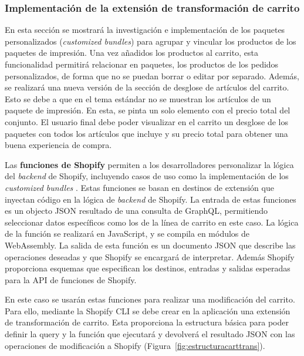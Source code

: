 \documentclass[11pt]{article}
\begin{document}
\clearpage
\subsubsection{Implementación de la extensión de transformación de carrito}
En esta sección se mostrará la investigación e implementación de los paquetes personalizados (\textit{customized bundles}) para agrupar y vincular los
productos de los paquetes de impresión. Una vez añadidos los productos al carrito, esta funcionalidad permitirá relacionar en paquetes, los productos de los pedidos personalizados, de forma que no se puedan borrar
o editar por separado. Además, se realizará una nueva versión de la sección de desglose de artículos del carrito. Esto se debe a que en el tema estándar no se muestran los artículos de un paquete 
de impresión. En esta, se pinta un solo elemento con el precio total del conjunto. El usuario final debe poder visualizar en el carrito un desglose de los paquetes con todos los artículos que incluye y su precio 
total para obtener una buena experiencia de compra.

Las \textbf{funciones de Shopify} \cite{shopify-functions} permiten a los desarrolladores personalizar la lógica del \textit{backend} de Shopify, incluyendo casos de uso como la implementación de los
\textit{customized bundles} \cite{paquete-personalizado}. Estas funciones se basan en destinos de extensión que inyectan código en la lógica de \textit{backend} de Shopify. La entrada de estas funciones es un objecto JSON resultado de una
consulta de GraphQL, permitiendo seleccionar datos específicos como los de la línea de carrito en este caso. La lógica de la función se realizará en JavaScript, y se compila en módulos de WebAssembly.
La salida de esta función es un documento JSON que describe las operaciones deseadas y que Shopify se encargará de interpretar. Además Shopify proporciona esquemas que especifican los 
destinos, entradas y salidas esperadas para la API de funciones de Shopify.

En este caso se usarán estas funciones para realizar una modificación del carrito. Para ello, mediante la Shopify CLI se debe crear en la aplicación una extensión de transformación de carrito. Esta proporciona 
la estructura básica para poder definir la query y la función que ejecutará y devolverá el resultado JSON con las operaciones de modificación a Shopify (Figura~\ref{fig:estructuracarttrans}). 
\end{document}
